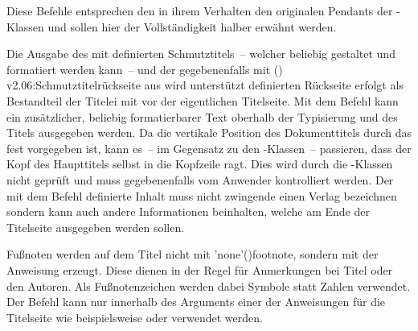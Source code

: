 \begin{DeclareEntity*}{}
\begin{DeclareEntity*}{}
\begin{DeclareEntity*}{}
\begin{Entity}{}
\begin{Declaration}
  {}
\begin{Declaration}
  {}
\begin{Declaration}
  {}
\begin{Declaration}
  {}
\begin{Declaration}
  {}
\begin{Declaration}
  {}
\begin{Declaration}
  {}
\begin{Declaration}
  {}
\printdeclarationlist

Diese Befehle entsprechen den in ihrem Verhalten den originalen Pendants der 
\KOMAScript-Klassen und sollen hier der Vollständigkeit halber erwähnt werden.

Die Ausgabe des mit  definierten Schmutztitels~-- welcher 
beliebig gestaltet und formatiert werden kann~-- und der gegebenenfalls mit 
(){%
  v2.06:Schmutztitelrückseite aus  wird unterstützt%
}%
 definierten Rückseite erfolgt als Bestandteil der Titelei 
mit  vor der eigentlichen Titelseite. Mit dem Befehl 
 kann ein zusätzlicher, beliebig formatierbarer Text oberhalb 
der Typisierung und des Titels ausgegeben werden. Da die vertikale Position des 
Dokumenttitels durch das \CD fest vorgegeben ist, kann es~-- im Gegensatz zu 
den \KOMAScript-Klassen~-- passieren, dass der Kopf des Haupttitels selbst in 
die Kopfzeile ragt. Dies wird durch die \TUDScript-Klassen nicht geprüft und 
muss gegebenenfalls vom Anwender kontrolliert werden. Der mit dem Befehl 
 definierte Inhalt muss nicht zwingende einen Verlag 
bezeichnen sondern kann auch andere Informationen beinhalten, welche am Ende 
der Titelseite ausgegeben werden sollen.

Fußnoten werden auf dem Titel nicht mit 
\Macro'none'(){footnote}, sondern mit der Anweisung 
 erzeugt. Diese dienen in der Regel für Anmerkungen bei Titel 
oder den Autoren. Als Fußnotenzeichen werden dabei Symbole statt Zahlen 
verwendet. Der Befehl  kann nur innerhalb des Arguments einer der 
Anweisungen für die Titelseite wie beispielsweise  oder 
 verwendet werden.


\end{Declaration}
\end{Declaration}
\end{Declaration}
\end{Declaration}
\end{Declaration}
\end{Declaration}
\end{Declaration}
\end{Declaration}
\end{Entity}
\end{DeclareEntity*}
\end{DeclareEntity*}
\end{DeclareEntity*}
